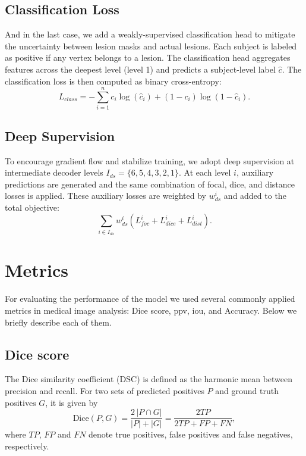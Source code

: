 \documentclass[FCD_GNN.tex]{subfiles}
\begin{document}
\subsection{Classification Loss}
And in the last case, we add a weakly-supervised classification head to mitigate the uncertainty between lesion masks and actual lesions. Each subject is labeled as positive if any vertex belongs to a lesion. The classification head aggregates features across the deepest level (level 1) and predicts a subject-level label $\hat{c}$. The classification loss is then computed as binary cross-entropy:
\[
L_{class} = - \sum_{i=1}^{n} c_i \log(\hat{c}_i) + (1-c_i)\log(1-\hat{c}_i).
\]

\subsection{Deep Supervision}
To encourage gradient flow and stabilize training, we adopt deep supervision at intermediate decoder levels $I_{ds} = \{6,5,4,3,2,1\}$. At each level $i$, auxiliary predictions are generated and the same combination of focal, dice, and distance losses is applied. These auxiliary losses are weighted by $w^i_{ds}$ and added to the total objective:
\[
\sum_{i \in I_{ds}} w^i_{ds}(L^i_{foc} + L^i_{dice} + L^i_{dist}).
\]

\bigskip

\section{Metrics}
For evaluating the performance of the model we used several commonly applied metrics in medical image 
analysis: Dice score, \ac{ppv}, \ac{iou}, and Accuracy.  
Below we briefly describe each of them.

\subsection{Dice score} 
The Dice similarity coefficient (DSC) is defined as the harmonic mean between precision and recall. 
For two sets of predicted positives $P$ and ground truth positives $G$, it is given by
\[
\mathrm{Dice}(P,G) = \frac{2 \, |P \cap G|}{|P| + |G|} = \frac{2TP}{2TP + FP + FN},
\]
where $TP$, $FP$ and $FN$ denote true positives, false positives and false negatives, respectively.
\end{document}

